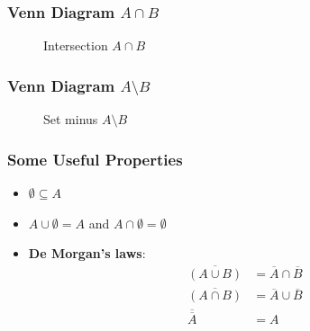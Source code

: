 \documentclass[12pt,aspectratio=169]{beamer}
\def\secondcircle{(210:1.75cm) circle (2cm)}
\def\thirdcircle{(330:1.75cm) circle (2cm)}
\begin{document}
\begin{frame}
\frametitle{Venn Diagram $A\cap B$}
\begin{center}
\begin{figure}
    \caption{Intersection $A\cap B$}
    \end{figure}
\end{center}

\end{frame}


\begin{frame}
\frametitle{Venn Diagram $A\setminus B$}
\begin{center}
\begin{figure}
    \caption{Set minus $A\setminus B$}
    \end{figure}
\end{center}

\end{frame}

\begin{frame}
\frametitle{Some Useful Properties}
\begin{itemize}
\item $\emptyset \subseteq A$
\bigskip
\item $A\cup \emptyset=A$ and $A \cap \emptyset=\emptyset$
 \bigskip

\item \textbf{De Morgan's laws}:
\[
\begin{aligned}
\overline{(A\cup B)}&=\overline{A}\cap \overline{B} \\ 
\overline{(A\cap B)}&=\overline{A}\cup \overline{B}\\
\overline{\overline{A}}&=A
\end{aligned}
\] 

\end{itemize}
\end{frame}
\end{document}
